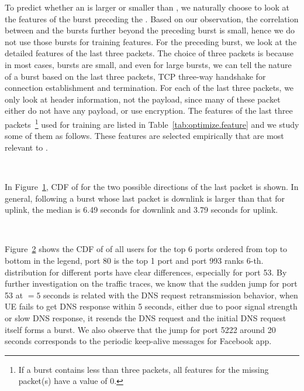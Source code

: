To predict whether an \IBT is larger or smaller than \SBT, we naturally choose to look at the features of the burst preceding the \IBT. Based on our observation, the correlation between \IBT and the bursts further beyond the preceding burst is small, hence we do not use those bursts for training features. For the preceding burst, we look at the detailed features of the last three packets. The choice of three packets is because in most cases, bursts are small, and even for large bursts, we can tell the nature of a burst based on the last three packets, \eg TCP three-way handshake for connection establishment and termination. For each of the last three packets, we only look at header information, not the payload, since many of these packet either do not have any payload, or use encryption. The features of the last three packets~\footnote{If a burst contains less than three packets, all features for the missing packet(s) have a value of 0.} used for training are listed in Table~\ref{tab:optimize.feature} and we study some of them as follows. These features are selected empirically that are most relevant to \IBT.


\begin{figure}[t]
\centering
{} \\
\label{fig:dir1}
\end{figure}

In Figure~\ref{fig:dir1}, CDF of \IBT for the two possible directions of the last packet is shown. In general, \IBT following a burst whose last packet is downlink is larger than that for uplink, \eg the median \IBT is 6.49 seconds for downlink and 3.79 seconds for uplink.

\begin{figure}[t]
\centering
{} \\
\label{fig:port1}
\end{figure}
Figure~\ref{fig:port1} shows the CDF of \IBTS of all users for the top 6 ports ordered from top to bottom in the legend, \ie port 80 is the top 1 port and port 993 ranks 6-th. \IBT distribution for different ports have clear differences, especially for port 53. By further investigation on the traffic traces, we know that the sudden jump for port 53 at \IBT $=5$ seconds is related with the DNS request retransmission behavior, \ie when UE fails to get DNS response within 5 seconds, either due to poor signal strength or slow DNS response, it resends the DNS request and the initial DNS request itself forms a burst. We also observe that the jump for port 5222 around 20 seconds corresponds to the periodic keep-alive messages for Facebook app.

